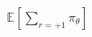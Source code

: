 \documentclass[preview]{standalone}
\begin{document}
\begin{align*}
\mathbb{E}\left[\sum_{r=+1}\pi_\theta\right]
\end{align*}
\end{document}
